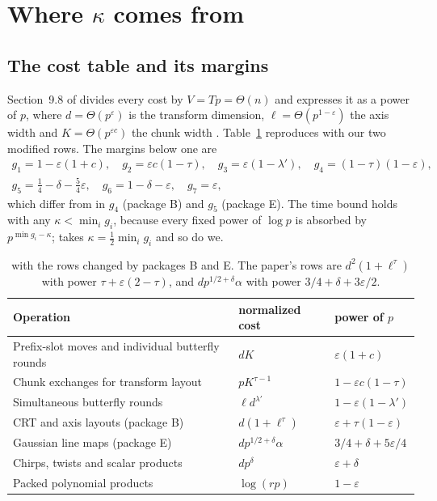 \section{Where \texorpdfstring{$\kappa$}{kappa} comes from}\label{sec:accounting}

\subsection{The cost table and its margins}

Section~9.8 of \cite{OAI} divides every cost by $V = Tp = \Theta(n)$ and expresses it as a power of $p$, where $d = \Theta(p^\varepsilon)$ is the transform dimension, $\ell = \Theta(p^{1-\varepsilon})$ the axis width and $K = \Theta(p^{\varepsilon c})$ the chunk width \cite[(39)]{OAI}. Table~\ref{tab:costs} reproduces \cite[Table~1]{OAI} with our two modified rows. The margins below one are
\begin{equation}\label{eq:gaps}
\begin{gathered}
g_1 = 1-\varepsilon(1+c),\quad g_2 = \varepsilon c(1-\tau),\quad g_3 = \varepsilon(1-\lambda'),\quad g_4 = (1-\tau)(1-\varepsilon),\\
g_5 = \tfrac14 - \delta - \tfrac54\varepsilon,\quad g_6 = 1-\delta-\varepsilon,\quad g_7 = \varepsilon,
\end{gathered}
\end{equation}
which differ from \cite[(45)]{OAI} in $g_4$ (package B) and $g_5$ (package E). The time bound holds with any $\kappa < \min_i g_i$, because every fixed power of $\log p$ is absorbed by $p^{\min g_i - \kappa}$; \cite{OAI} takes $\kappa = \tfrac12 \min_i g_i$ and so do we.

\begin{table}[ht]
\centering
\small
\begin{tabular}{@{}lll@{}}
\toprule
Operation & normalized cost & power of $p$ \\
\midrule
Prefix-slot moves and individual butterfly rounds & $dK$ & $\varepsilon(1+c)$ \\
Chunk exchanges for transform layout & $pK^{\tau-1}$ & $1-\varepsilon c(1-\tau)$ \\
Simultaneous butterfly rounds & $\ell d^{\lambda'}$ & $1-\varepsilon(1-\lambda')$ \\
CRT and axis layouts (package B) & $d(1+\ell^\tau)$ & $\varepsilon + \tau(1-\varepsilon)$ \\
Gaussian line maps (package E) & $dp^{1/2+\delta}\alpha$ & $3/4+\delta+5\varepsilon/4$ \\
Chirps, twists and scalar products & $dp^\delta$ & $\varepsilon+\delta$ \\
Packed polynomial products & $\log(rp)$ & $1-\varepsilon$ \\
\bottomrule
\end{tabular}
\caption{\cite[Table~1]{OAI} with the rows changed by packages B and E. The paper's rows are $d^2(1+\ell^\tau)$ with power $\tau+\varepsilon(2-\tau)$, and $dp^{1/2+\delta}\alpha$ with power $3/4+\delta+3\varepsilon/2$.}
\label{tab:costs}
\end{table}

